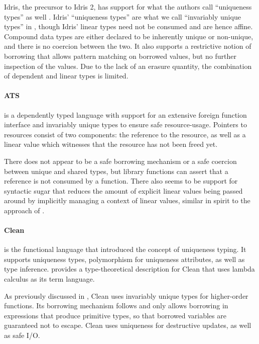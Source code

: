 Idris, the precursor to Idris 2, has support for what the authors call ``uniqueness types'' as well \citep{brady_type-driven_2017}. Idris' ``uniqueness types'' are what we call ``invariably unique types'' in , though Idris' linear types need not be consumed and are hence affine. Compound data types are either declared to be inherently unique or non-unique, and there is no coercion between the two. It also supports a restrictive notion of borrowing that allows pattern matching on borrowed values, but no further inspection of the values. Due to the lack of an erasure quantity, the combination of dependent and linear types is limited.

\paragraph{ATS \citep{shi_linear_2013}} is a dependently typed language with support for an extensive foreign function interface and invariably unique types to ensure safe resource-usage. Pointers to resources consist of two components: the reference to the resource, as well as a linear value which witnesses that the resource has not been freed yet. 

There does not appear to be a safe borrowing mechanism or a safe coercion between unique and shared types, but library functions can assert that a reference is not consumed by a function. There also seems to be support for syntactic sugar that reduces the amount of explicit linear values being passed around by implicitly managing a context of linear values, similar in spirit to the approach of \cite{spiwack_linearly_2022}.

\paragraph{Clean \citep{smetsers_guaranteeing_1994}} is the functional language that introduced the concept of uniqueness typing. It supports uniqueness types, polymorphism for uniqueness attributes, as well as type inference. \cite{de_vries_making_2009} provides a type-theoretical description for Clean that uses lambda calculus as its term language. 

As previously discussed in , Clean uses invariably unique types for higher-order functions. Its borrowing mechanism follows \cite{wadler_linear_1990} and only allows borrowing in expressions that produce primitive types, so that borrowed variables are guaranteed not to escape. Clean uses uniqueness for destructive updates, as well as safe I/O.

